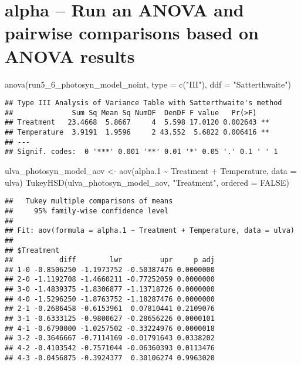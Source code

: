 \documentclass[
]{article}
\newenvironment{Shaded}{\begin{snugshade}}{\end{snugshade}}
\newcommand{\AttributeTok}[1]{\textcolor[rgb]{0.77,0.63,0.00}{#1}}
\newcommand{\ConstantTok}[1]{\textcolor[rgb]{0.00,0.00,0.00}{#1}}
\newcommand{\FloatTok}[1]{\textcolor[rgb]{0.00,0.00,0.81}{#1}}
\newcommand{\FunctionTok}[1]{\textcolor[rgb]{0.00,0.00,0.00}{#1}}
\newcommand{\NormalTok}[1]{#1}
\newcommand{\OtherTok}[1]{\textcolor[rgb]{0.56,0.35,0.01}{#1}}
\newcommand{\SpecialCharTok}[1]{\textcolor[rgb]{0.00,0.00,0.00}{#1}}
\newcommand{\StringTok}[1]{\textcolor[rgb]{0.31,0.60,0.02}{#1}}
\begin{document}
\hypertarget{alpha-run-an-anova-and-pairwise-comparisons-based-on-anova-results}{%
\section{alpha -- Run an ANOVA and pairwise comparisons based on ANOVA
results}\label{alpha-run-an-anova-and-pairwise-comparisons-based-on-anova-results}}

\begin{Shaded}
\begin{Highlighting}[]
\FunctionTok{anova}\NormalTok{(run5\_6\_photosyn\_model\_noint, }\AttributeTok{type =} \FunctionTok{c}\NormalTok{(}\StringTok{"III"}\NormalTok{), }\AttributeTok{ddf =} \StringTok{"Satterthwaite"}\NormalTok{)}
\end{Highlighting}
\end{Shaded}

\begin{verbatim}
## Type III Analysis of Variance Table with Satterthwaite's method
##              Sum Sq Mean Sq NumDF  DenDF F value   Pr(>F)   
## Treatment   23.4668  5.8667     4  5.598 17.0120 0.002643 **
## Temperature  3.9191  1.9596     2 43.552  5.6822 0.006416 **
## ---
## Signif. codes:  0 '***' 0.001 '**' 0.01 '*' 0.05 '.' 0.1 ' ' 1
\end{verbatim}

\begin{Shaded}
\begin{Highlighting}[]
\NormalTok{ulva\_photosyn\_model\_aov }\OtherTok{\textless{}{-}} \FunctionTok{aov}\NormalTok{(alpha}\FloatTok{.1} \SpecialCharTok{\textasciitilde{}}\NormalTok{ Treatment }\SpecialCharTok{+}\NormalTok{ Temperature, }\AttributeTok{data =}\NormalTok{ ulva)}
\FunctionTok{TukeyHSD}\NormalTok{(ulva\_photosyn\_model\_aov, }\StringTok{"Treatment"}\NormalTok{, }\AttributeTok{ordered =} \ConstantTok{FALSE}\NormalTok{)}
\end{Highlighting}
\end{Shaded}

\begin{verbatim}
##   Tukey multiple comparisons of means
##     95% family-wise confidence level
## 
## Fit: aov(formula = alpha.1 ~ Treatment + Temperature, data = ulva)
## 
## $Treatment
##           diff        lwr         upr     p adj
## 1-0 -0.8506250 -1.1973752 -0.50387476 0.0000000
## 2-0 -1.1192708 -1.4660211 -0.77252059 0.0000000
## 3-0 -1.4839375 -1.8306877 -1.13718726 0.0000000
## 4-0 -1.5296250 -1.8763752 -1.18287476 0.0000000
## 2-1 -0.2686458 -0.6153961  0.07810441 0.2109076
## 3-1 -0.6333125 -0.9800627 -0.28656226 0.0000101
## 4-1 -0.6790000 -1.0257502 -0.33224976 0.0000018
## 3-2 -0.3646667 -0.7114169 -0.01791643 0.0338202
## 4-2 -0.4103542 -0.7571044 -0.06360393 0.0113476
## 4-3 -0.0456875 -0.3924377  0.30106274 0.9963020
\end{verbatim}
\end{document}
